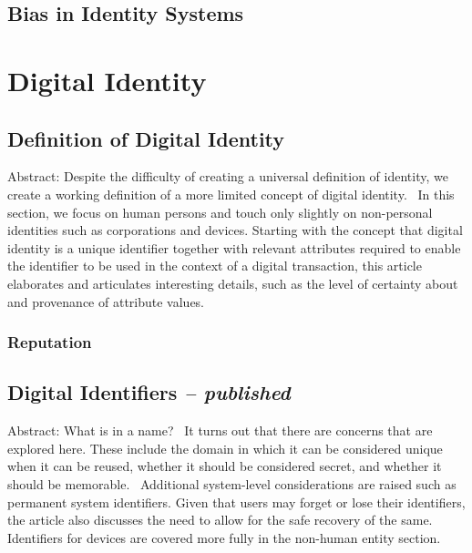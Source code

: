 \hypertarget{bias-in-identity-systems}{%
\section{Bias in Identity Systems}\label{bias-in-identity-systems}}

\hypertarget{digital-identity}{%
\chapter{Digital Identity}\label{digital-identity}}

\hypertarget{definition-of-digital-identity}{%
\section{Definition of Digital
Identity}\label{definition-of-digital-identity}}

Abstract: Despite the difficulty of creating a universal definition of
identity, we create a working definition of a more limited concept of
digital identity.~ In this section, we focus on human persons and touch
only slightly on non-personal identities such as corporations and
devices. Starting with the concept that digital identity is a unique
identifier together with relevant attributes required to enable the
identifier to be used in the context of a digital transaction, this
article elaborates and articulates interesting details, such as the
level of certainty about and provenance of attribute values.

\hypertarget{reputation}{%
\subsection{Reputation}\label{reputation}}

\hypertarget{digital-identifiers-published}{%
\section{\texorpdfstring{Digital Identifiers \emph{--
published}}{Digital Identifiers -- published}}\label{digital-identifiers-published}}

Abstract: What is in a name?~ It turns out that there are concerns that
are explored here. These include the domain in which it can be
considered unique when it can be reused, whether it should be considered
secret, and whether it should be memorable.~ Additional system-level
considerations are raised such as permanent system identifiers. Given
that users may forget or lose their identifiers, the article also
discusses the need to allow for the safe recovery of the same.
Identifiers for devices are covered more fully in the non-human entity
section.

